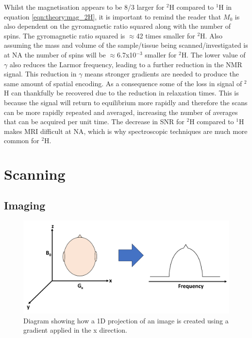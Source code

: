 Whilst the magnetisation appears to be 8/3 larger for $^2$H compared to $^1$H in equation \ref{eqn:theory:mag_2H}, it is important to remind the reader that $M_0$ is also dependent on the gyromagnetic ratio squared along with the number of spins. The gyromagnetic ratio squared is $\approx$42 times smaller for $^2$H. Also assuming the mass and volume of the sample/tissue being scanned/investigated is at \ac{NA} the number of spins will be $\approx$6.7x10$^{-3}$ smaller for $^2$H. The lower value of $\gamma$ also reduces the Larmor frequency, leading to a further reduction in the NMR signal. This reduction in $\gamma$ means stronger gradients are needed to produce the same amount of spatial encoding. As a consequence some of the loss in signal of $^2$H can thankfully be recovered due to the reduction in relaxation times. This is because the signal will return to equilibrium more rapidly and therefore the scans can be more rapidly repeated and averaged, increasing the number of averages that can be acquired per unit time. The decrease in \ac{SNR} for $^2$H compared to $^1$H makes \ac{MRI} difficult at \ac{NA}, which is why spectroscopic techniques are much more common for $^2$H. 


\section{Scanning}   

\subsection{Imaging}

\begin{figure}[h]
    \centering
    \includegraphics[width=1\textwidth]{Figures/Theory/1D_Projection.png}
    \caption{Diagram showing how a 1D projection of an image is created using a gradient applied in the x direction.}
    \label{fig:theory:1D}
\end{figure}

